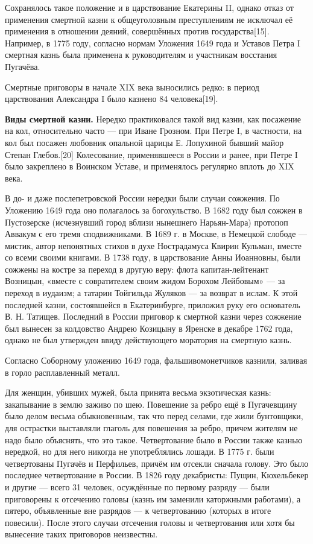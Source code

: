 Сохранялось такое положение и в царствование Екатерины II, однако отказ от применения смертной казни к общеуголовным преступлениям не исключал её применения в отношении деяний, совершённых против государства[15]. Например, в 1775 году, согласно нормам Уложения 1649 года и Уставов Петра I смертная казнь была применена к руководителям и участникам восстания Пугачёва.

Смертные приговоры в начале XIX века выносились редко: в период царствования Александра I было казнено 84 человека[19].

\textbf{Виды смертной казни.} Нередко практиковался такой вид казни, как посажение на кол, относительно часто — при Иване Грозном. При Петре I, в частности, на кол был посажен любовник опальной царицы Е. Лопухиной бывший майор Степан Глебов.[20] Колесование, применявшееся в России и ранее, при Петре I было закреплено в Воинском Уставе, и применялось регулярно вплоть до XIX века.

В до- и даже послепетровской России нередки были случаи сожжения. По Уложению 1649 года оно полагалось за богохульство. В 1682 году был сожжен в Пустозерске (исчезнувший город вблизи нынешнего Нарьян-Мара) протопоп Аввакум с его тремя сподвижниками. В 1689 г. в Москве, в Немецкой слободе — мистик, автор непонятных стихов в духе Нострадамуса Квирин Кульман, вместе со всеми своими книгами. В 1738 году, в царствование Анны Иоанновны, были сожжены на костре за переход в другую веру: флота капитан-лейтенант Возницын, «вместе с совратителем своим жидом Борохом Лейбовым» — за переход в иудаизм; а татарин Тойгильда Жуляков — за возврат в ислам. К этой последней казни, состоявшейся в Екатеринбурге, приложил руку его основатель В. Н. Татищев. Последний в России приговор к смертной казни через сожжение был вынесен за колдовство Андрею Козицыну в Яренске в декабре 1762 года, однако не был утвержден ввиду действующего моратория на смертную казнь.

Согласно Соборному уложению 1649 года, фальшивомонетчиков казнили, заливая в горло расплавленный металл.

Для женщин, убивших мужей, была принята весьма экзотическая казнь: закапывание в землю заживо по шею. Повешение за ребро ещё в Пугачевщину было делом весьма обыкновенным, так что перед селами, где жили бунтовщики, для острастки выставляли глаголь для повешения за ребро, причем жителям не надо было объяснять, что это такое. Четвертование было в России также казнью нередкой, но для него никогда не употреблялись лошади. В 1775 г. были четвертованы Пугачёв и Перфильев, причём им отсекли сначала голову. Это было последнее четвертование в России. В 1826 году декабристы: Пущин, Кюхельбекер и другие — всего 31 человек, осуждённые по первому разряду — были приговорены к отсечению головы (казнь им заменили каторжными работами), а пятеро, объявленные вне разрядов — к четвертованию (которых в итоге повесили). После этого случаи отсечения головы и четвертования или хотя бы вынесение таких приговоров неизвестны.

